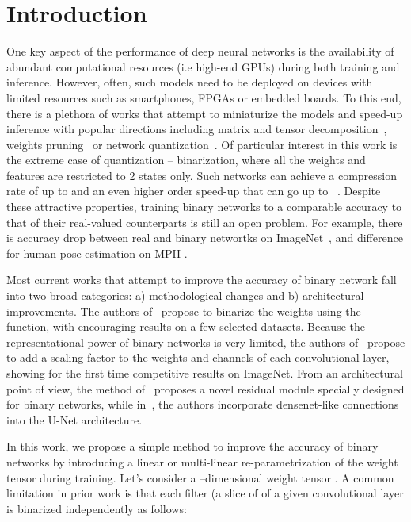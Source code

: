 \documentclass[10pt,twocolumn,letterpaper]{article}
\begin{document}
\section{Introduction}\label{sec:introduction}

One key aspect of the performance of deep neural networks is the availability of abundant computational resources (i.e high-end GPUs) during both training and inference. However, often, such models need to be deployed on devices with limited resources such as smartphones, FPGAs or embedded boards. To this end, there is a plethora of works that attempt to miniaturize the models and speed-up inference with popular directions including matrix and tensor decomposition~\cite{lebedev2014speeding,kim2015compression}, weights pruning~\cite{han2015learning} or network quantization~\cite{courbariaux2014training,lin2015fixed}. Of particular interest in this work is the extreme case of quantization -- binarization, where all the weights and features are restricted to 2 states only. Such networks can achieve a compression rate of up to  and an even higher order speed-up that can go up to ~\cite{rastegari2016xnor,courbariaux2015binaryconnect}. 
Despite these attractive properties, training binary networks to a comparable accuracy to that of their real-valued counterparts is still an open problem. For example, there is  accuracy drop between real and binary networtks on ImageNet~\cite{rastegari2016xnor}, and  difference for human pose estimation on MPII \cite{bulat2017binarized}.    

Most current works that attempt to improve the accuracy of binary network fall into two broad categories: a) methodological changes and b) architectural improvements. The authors of~\cite{courbariaux2015binaryconnect} propose to binarize the weights using the  function, with encouraging results on a few selected datasets. Because the representational power of binary networks is very limited, the authors of~\cite{rastegari2016xnor} propose to add a scaling factor to the weights and channels of each convolutional layer, showing for the first time competitive results on ImageNet. From an architectural point of view, the method of~\cite{bulat2017binarized} proposes a novel residual module specially designed for binary networks, while in~\cite{tang2018quantized}, the authors incorporate  densenet-like connections into the U-Net architecture.

In this work, we propose a simple method to improve the accuracy of binary networks by introducing a linear or multi-linear re-parametrization of the weight tensor during training. Let's consider a --dimensional weight tensor .
A common limitation in prior work is that each filter  (a slice of  of a given convolutional layer is binarized independently as follows: 
 
\end{document}
